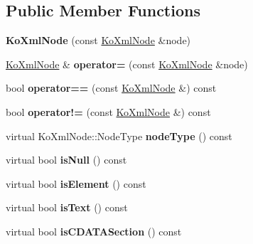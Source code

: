 \subsection*{Public Member Functions}
\begin{DoxyCompactItemize}
\item 
\hypertarget{classKoXmlNode_ab88c9ac0386a4c92ede215f97afc87e3}{
{\bfseries KoXmlNode} (const \hyperlink{classKoXmlNode}{KoXmlNode} \&node)}
\label{classKoXmlNode_ab88c9ac0386a4c92ede215f97afc87e3}

\item 
\hypertarget{classKoXmlNode_a06a42651d8b1d8d46ccfd963789d28a3}{
\hyperlink{classKoXmlNode}{KoXmlNode} \& {\bfseries operator=} (const \hyperlink{classKoXmlNode}{KoXmlNode} \&node)}
\label{classKoXmlNode_a06a42651d8b1d8d46ccfd963789d28a3}

\item 
\hypertarget{classKoXmlNode_a0c491bd3aa1f60c7c2f8aa66fcaf7ad4}{
bool {\bfseries operator==} (const \hyperlink{classKoXmlNode}{KoXmlNode} \&) const }
\label{classKoXmlNode_a0c491bd3aa1f60c7c2f8aa66fcaf7ad4}

\item 
\hypertarget{classKoXmlNode_aa7320ffe46fab32645e9f912793318df}{
bool {\bfseries operator!=} (const \hyperlink{classKoXmlNode}{KoXmlNode} \&) const }
\label{classKoXmlNode_aa7320ffe46fab32645e9f912793318df}

\item 
\hypertarget{classKoXmlNode_a8fdc94c286b2ee40ed1d3e418739245a}{
virtual KoXmlNode::NodeType {\bfseries nodeType} () const }
\label{classKoXmlNode_a8fdc94c286b2ee40ed1d3e418739245a}

\item 
\hypertarget{classKoXmlNode_a93fadc49d9739def1d0377760b804294}{
virtual bool {\bfseries isNull} () const }
\label{classKoXmlNode_a93fadc49d9739def1d0377760b804294}

\item 
\hypertarget{classKoXmlNode_a27d714ac8a277c16d90cbeaf87e23105}{
virtual bool {\bfseries isElement} () const }
\label{classKoXmlNode_a27d714ac8a277c16d90cbeaf87e23105}

\item 
\hypertarget{classKoXmlNode_a1018dd29ae7b00e453bd577764b71ecd}{
virtual bool {\bfseries isText} () const }
\label{classKoXmlNode_a1018dd29ae7b00e453bd577764b71ecd}

\item 
\hypertarget{classKoXmlNode_ae84ca4ef65b1d85ed8b90a07fb324fc8}{
virtual bool {\bfseries isCDATASection} () const }
\label{classKoXmlNode_ae84ca4ef65b1d85ed8b90a07fb324fc8}


\end{DoxyCompactItemize}
